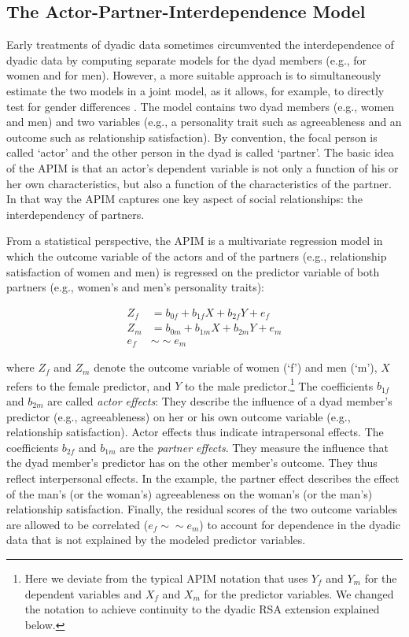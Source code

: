 \documentclass[jou,a4paper,draftfirst]{apa6}
\begin{document}
\subsection{The Actor-Partner-Interdependence Model}
Early treatments of dyadic data sometimes circumvented the interdependence of dyadic data by computing separate models for the dyad members (e.g., for women and for men). However, a more suitable approach is to simultaneously estimate the two models in a joint model, as it allows, for example, to directly test for gender differences \parencite{kenny_dyadic_2006}. The model contains two dyad members (e.g., women and men) and two variables (e.g., a personality trait such as agreeableness and an outcome such as relationship satisfaction). By convention, the focal person is called ‘actor’ and the other person in the dyad is called ‘partner’. The basic idea of the APIM is that an actor's dependent variable is not only a function of his or her own characteristics, but also a function of the characteristics of the partner. In that way the APIM captures one key aspect of social relationships: the interdependency of partners.

From a statistical perspective, the APIM is a multivariate regression model \parencite[cf.][]{kenny_dyadic_2006,NestlerEtAl2015} in which the outcome variable of the actors and of the partners (e.g., relationship satisfaction of women and men) is regressed on the predictor variable of both partners (e.g., women's and men's personality traits):

\begin{equation}
\label{al:apim}
\begin{split}
Z_{f} &= b_{0f} + b_{1f} X + b_{2f} Y + e_{f} \\
Z_{m} &= b_{0m} + b_{1m} X + b_{2m} Y + e_{m} \\
e_f &\sim\sim e_m
\end{split}
\end{equation}

where $Z_f$ and $Z_m$ denote the outcome variable of women (‘f’) and men (‘m’), $X$ refers to the female predictor, and $Y$ to the male predictor.\footnote{Here we deviate from the typical APIM notation that uses $Y_f$ and $Y_m$ for the dependent variables and $X_f$ and $X_m$ for the predictor variables. We changed the notation to achieve continuity to the dyadic RSA extension explained below.} The coefficients $b_{1f}$ and $b_{2m}$ are called \textit{actor effects}: They describe the influence of a dyad member’s predictor (e.g., agreeableness) on her or his own outcome variable (e.g., relationship satisfaction). Actor effects thus indicate intrapersonal effects. The coefficients $b_{2f}$ and $b_{1m}$ are the \textit{partner effects}. They measure the influence that the dyad member’s predictor has on the other member’s outcome. They thus reflect interpersonal effects. In the example, the partner effect describes the effect of the man’s (or the woman’s) agreeableness on the woman’s (or the man’s) relationship satisfaction. Finally, the residual scores of the two outcome variables are allowed to be correlated ($e_f \sim\sim e_m$) to account for dependence in the dyadic data that is not explained by the modeled predictor variables.
\end{document}
